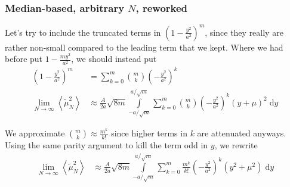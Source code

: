 \documentclass[10pt]{article}
\newcommand{\expvalue}[1]{\left<#1\right>}
\begin{document}
\subsubsection{Median-based, arbitrary $N$, reworked}

Let's try to include the truncated terms in $\left( 1 - \frac{y^2}{a^2}
\right)^m$, since they really are rather non-small compared to the leading term
that we kept. Where we had before put $1 - \frac{my^2}{a^2}$, we should instead
put
\begin{align}
    \left( 1 - \frac{y^2}{a^2} \right)^m
        &= \sum\limits_{k=0}^{m} \binom{m}{k}\left( -\frac{y^2}{a^2} \right)^k\\
    \lim_{N \to \infty}\expvalue{\tilde{\mu}_N^2}
        &\approx \frac{A}{2a}\sqrt{8m}
            \int\limits_{-a/\sqrt{m}}^{a/\sqrt{m}}
                \sum\limits_{k=0}^{m}\binom{m}{k}
                    \left( -\frac{y^2}{a^2} \right)^k
                (y+\mu)^2
            \;\mathrm{d}y
\end{align}

We approximate $\binom{m}{k} \approx \frac{m^k}{k!}$ since higher terms in $k$
are attenuated anyways. Using the same parity argument to kill the term odd in
$y$, we rewrite
\begin{align}
    \lim_{N \to \infty}\expvalue{\tilde{\mu}_N^2}
        &\approx \frac{A}{2a}\sqrt{8m}
            \int\limits_{-a/\sqrt{m}}^{a/\sqrt{m}}
                \sum\limits_{k=0}^{m}\frac{m^k}{k!}
                    \left( -\frac{y^2}{a^2} \right)^k
                (y^2+\mu^2)
            \;\mathrm{d}y
\end{align}
\end{document}
